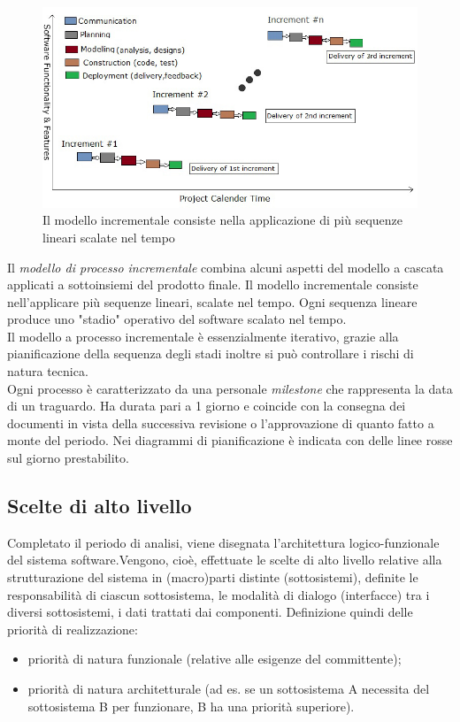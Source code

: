 \documentclass[12pt,a4paper,titlepage]{article}
\begin{document}
		\begin{figure}[h]
			\centering
			\includegraphics[width=1\linewidth]{Incremental-Development}
			\caption[Incremental Development]{Il modello incrementale consiste nella applicazione di più sequenze lineari scalate nel tempo}
			\label{fig:incremental-development}
		\end{figure}
	
		Il \textit{modello di processo incrementale} combina alcuni aspetti del modello a cascata applicati a sottoinsiemi del prodotto finale. Il modello incrementale consiste nell'applicare più sequenze lineari, scalate nel tempo. Ogni sequenza lineare produce uno "stadio" operativo del software scalato nel tempo.\\
		Il modello a processo incrementale è essenzialmente iterativo, grazie alla pianificazione della sequenza degli stadi inoltre si può controllare i rischi di natura tecnica.\\
		Ogni processo è caratterizzato da una personale \textit{milestone} che rappresenta la data di un traguardo. Ha durata pari a 1 giorno e coincide con la consegna dei documenti in vista della successiva revisione o l'approvazione di quanto fatto a monte del periodo. Nei diagrammi di pianificazione è indicata con delle linee rosse sul giorno prestabilito.
		\subsection{Scelte di alto livello}
			Completato il periodo di analisi, viene disegnata l'architettura logico-funzionale del sistema software.Vengono, cioè, effettuate le scelte di alto livello relative alla strutturazione del sistema in (macro)parti distinte (sottosistemi), definite le responsabilità di ciascun sottosistema, le modalità di dialogo (interfacce) tra i diversi sottosistemi, i dati trattati dai componenti.
			Definizione quindi delle priorità di realizzazione:
			\begin{itemize}
				\item priorità di natura funzionale (relative alle esigenze del committente);
				\item priorità di natura architetturale (ad es. se un sottosistema A necessita del sottosistema B per funzionare, B ha una priorità superiore).
			\end{itemize}
		
\end{document}
